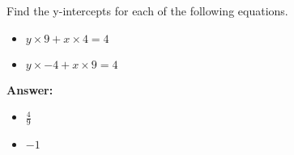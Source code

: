  Find the y-intercepts for each of the following equations. \begin{itemize}\item \( y \times 9 + x \times 4 = 4 \)\item \( y \times -4 + x \times 9 = 4 \)\end{itemize}

        \textbf{Answer:} \begin{itemize}\item \( \frac{4}{9} \)\item \( -1 \)\end{itemize}
